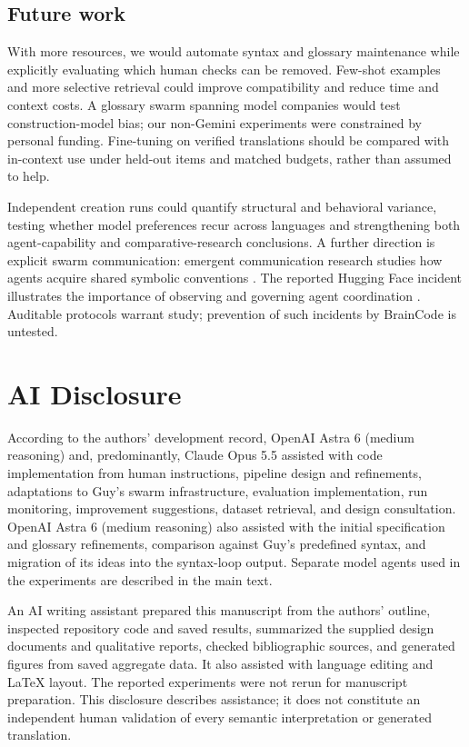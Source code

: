 \documentclass[11pt]{article}
\newcommand{\bc}{BrainCode}
\begin{document}
\subsection{Future work}
With more resources, we would automate syntax and glossary maintenance while explicitly evaluating which human checks can be removed. Few-shot examples and more selective retrieval could improve compatibility and reduce time and context costs. A glossary swarm spanning model companies would test construction-model bias; our non-Gemini experiments were constrained by personal funding. Fine-tuning on verified translations should be compared with in-context use under held-out items and matched budgets, rather than assumed to help.

Independent creation runs could quantify structural and behavioral variance, testing whether model preferences recur across languages and strengthening both agent-capability and comparative-research conclusions. A further direction is explicit swarm communication: emergent communication research studies how agents acquire shared symbolic conventions \citep{havrylov2017language,lazaridou2020communication}. The reported Hugging Face incident illustrates the importance of observing and governing agent coordination \citep{openai2026incident}. Auditable protocols warrant study; prevention of such incidents by \bc{} is untested.

\label{maintext:end}
\clearpage
\section*{AI Disclosure}
According to the authors' development record, OpenAI Astra 6 (medium reasoning) and, predominantly, Claude Opus 5.5 assisted with code implementation from human instructions, pipeline design and refinements, adaptations to Guy's swarm infrastructure, evaluation implementation, run monitoring, improvement suggestions, dataset retrieval, and design consultation. OpenAI Astra 6 (medium reasoning) also assisted with the initial specification and glossary refinements, comparison against Guy's predefined syntax, and migration of its ideas into the syntax-loop output. Separate model agents used in the experiments are described in the main text.

An AI writing assistant prepared this manuscript from the authors' outline, inspected repository code and saved results, summarized the supplied design documents and qualitative reports, checked bibliographic sources, and generated figures from saved aggregate data. It also assisted with language editing and LaTeX layout. The reported experiments were not rerun for manuscript preparation. This disclosure describes assistance; it does not constitute an independent human validation of every semantic interpretation or generated translation.
\end{document}
